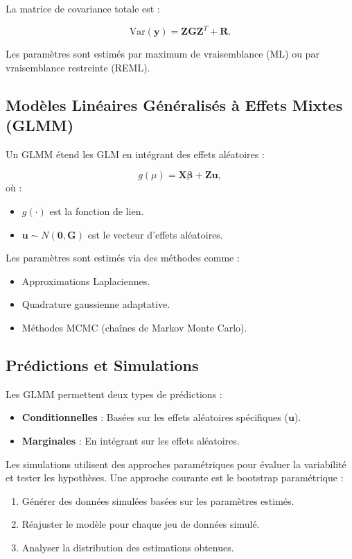 La matrice de covariance totale est :

\[ \mathrm{Var}(\mathbf{y}) = \mathbf{Z} \mathbf{G} \mathbf{Z}^T + \mathbf{R}. \]

Les paramètres sont estimés par maximum de vraisemblance (ML) ou par
vraisemblance restreinte (REML).

\subsection{Modèles Linéaires Généralisés à Effets Mixtes
(GLMM)}\label{moduxe8les-linuxe9aires-guxe9nuxe9ralisuxe9s-uxe0-effets-mixtes-glmm}

Un GLMM étend les GLM en intégrant des effets aléatoires :

\[ g(\mu) = \mathbf{X} \boldsymbol{\beta} + \mathbf{Z} \mathbf{u}, \] où
:

\begin{itemize}
\item
  \(g(\cdot)\) est la fonction de lien.
\item
  \(\mathbf{u} \sim N(\mathbf{0}, \mathbf{G})\) est le vecteur d'effets
  aléatoires.
\end{itemize}

Les paramètres sont estimés via des méthodes comme :

\begin{itemize}
\item
  Approximations Laplaciennes.
\item
  Quadrature gaussienne adaptative.
\item
  Méthodes MCMC (chaînes de Markov Monte Carlo).
\end{itemize}

\subsection{Prédictions et
Simulations}\label{pruxe9dictions-et-simulations}

Les GLMM permettent deux types de prédictions :

\begin{itemize}
\item
  \textbf{Conditionnelles} : Basées sur les effets aléatoires
  spécifiques (\(\mathbf{u}\)).
\item
  \textbf{Marginales} : En intégrant sur les effets aléatoires.
\end{itemize}

Les simulations utilisent des approches paramétriques pour évaluer la
variabilité et tester les hypothèses. Une approche courante est le
bootstrap paramétrique :

\begin{enumerate}
\def\labelenumi{\arabic{enumi}.}
\item
  Générer des données simulées basées sur les paramètres estimés.
\item
  Réajuster le modèle pour chaque jeu de données simulé.
\item
  Analyser la distribution des estimations obtenues.
\end{enumerate}

